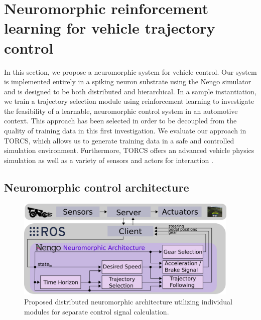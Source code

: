 \section{Neuromorphic reinforcement learning for vehicle trajectory control}%
\label{sec:neuromorphic_reinforcement_learning_for_vehicle_trajectory_control}

In this section, we propose a neuromorphic system for vehicle control.
Our system is implemented entirely in a spiking neuron substrate using the \ac{Nengo} simulator \cite{Bekolay2014} and is designed to be both distributed and hierarchical.
In a sample instantiation, we train a trajectory selection module using reinforcement learning to investigate the feasibility of a learnable, neuromorphic control system in an automotive context.
This approach has been selected in order to be decoupled from the quality of training data in this first investigation.
We evaluate our approach in \ac{TORCS}, which allows us to generate training data in a safe and controlled simulation environment.
Furthermore, \ac{TORCS} offers an advanced vehicle physics simulation as well as a variety of sensors and actors for interaction \cite{TORCS}.

\subsection{Neuromorphic control architecture}%
\label{subsec:neuromorphic_control_architecture}

\begin{figure}[t!]
\centering
  \includegraphics[width=0.95\textwidth]{imgs/Distributed-System-narrow.eps}
\caption{Proposed distributed neuromorphic architecture utilizing individual modules for separate control signal calculation. \label{fig:architecture}}
\end{figure}

